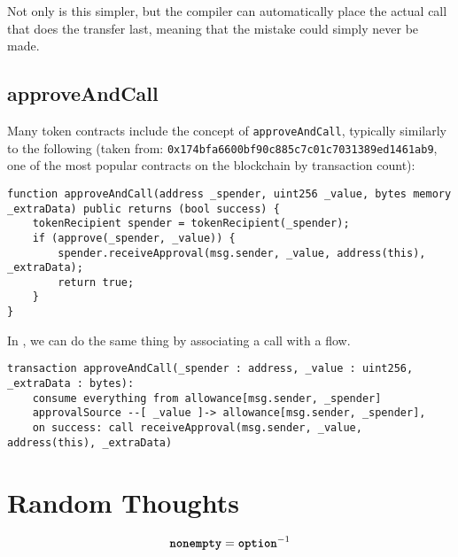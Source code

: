 \documentclass[10pt]{article}
\begin{document}
Not only is this simpler, but the compiler can automatically place the actual call that does the transfer last, meaning that the mistake could simply never be made.

\subsection{approveAndCall}

Many token contracts include the concept of \lstinline{approveAndCall}, typically similarly to the following (taken from: \lstinline{0x174bfa6600bf90c885c7c01c7031389ed1461ab9}, one of the most popular contracts on the blockchain by transaction count):
\begin{lstlisting}
function approveAndCall(address _spender, uint256 _value, bytes memory _extraData) public returns (bool success) {
    tokenRecipient spender = tokenRecipient(_spender);
    if (approve(_spender, _value)) {
        spender.receiveApproval(msg.sender, _value, address(this), _extraData);
        return true;
    }
}
\end{lstlisting}

In \langName, we can do the same thing by associating a call with a flow.
\begin{lstlisting}
transaction approveAndCall(_spender : address, _value : uint256, _extraData : bytes):
    consume everything from allowance[msg.sender, _spender]
    approvalSource --[ _value ]-> allowance[msg.sender, _spender],
    on success: call receiveApproval(msg.sender, _value, address(this), _extraData)
\end{lstlisting}

\section{Random Thoughts}

\begin{align*}
    \textbf{\texttt{nonempty}} &= \textbf{\texttt{option}}^{-1} \\
\end{align*}
\end{document}
